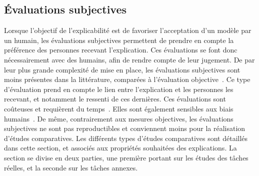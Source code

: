 

\subsection{\'Evaluations subjectives} \label{C1:ev_subj}
Lorsque l'objectif de l'explicabilité est de favoriser l'acceptation d'un modèle par un humain, les évaluations subjectives permettent de prendre en compte la préférence des personnes recevant l'explication. Ces évaluations se font donc nécessairement avec des humains, afin de rendre compte de leur jugement. De par leur plus grande complexité de mise en place, les évaluations subjectives sont moins présentes dans la littérature, comparées à l’évaluation objective~\cite{Lakkaraju2019}.
Ce type d'évaluation prend en compte le lien entre l'explication et les personnes les recevant, et notamment le ressenti de ces dernières.
Ces évaluations sont coûteuses et requièrent du temps~\cite{Dam2018, DoshiVelez2017}. Elles sont également sensibles aux biais humains~\cite{Petsiuk2018}.
De même, contrairement aux mesures objectives, les évaluations subjectives ne sont pas reproductibles et conviennent moins pour la réalisation d'études comparatives.
Les différents types d'études comparatives sont détaillés dans cette section, et associés aux propriétés souhaitées des explications.
La section se divise en deux parties, une première portant sur les études des tâches réelles, et la seconde sur les tâches annexes.

